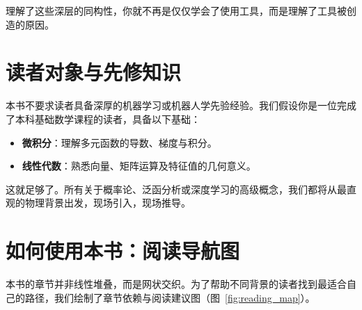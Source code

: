 理解了这些深层的同构性，你就不再是仅仅学会了使用工具，而是理解了工具被创造的原因。

\section*{读者对象与先修知识}

本书不要求读者具备深厚的机器学习或机器人学先验经验。我们假设你是一位完成了本科基础数学课程的读者，具备以下基础：
\begin{itemize}
    \item \textbf{微积分}：理解多元函数的导数、梯度与积分。
    \item \textbf{线性代数}：熟悉向量、矩阵运算及特征值的几何意义。
\end{itemize}

这就足够了。所有关于概率论、泛函分析或深度学习的高级概念，我们都将从最直观的物理背景出发，现场引入，现场推导。

\section*{如何使用本书：阅读导航图}

本书的章节并非线性堆叠，而是网状交织。为了帮助不同背景的读者找到最适合自己的路径，我们绘制了章节依赖与阅读建议图（图~\ref{fig:reading_map}）。

